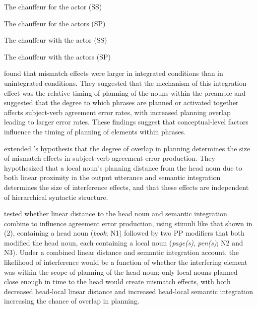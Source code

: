 \documentclass[12pt,titlepage]{article}
\newcommand{\IGNORE}[1]{} %
\begin{document}
    \begin{myexample}
\label{SP-ex}
\begin{examples}
    
    \item \label{SPintSS} The chauffeur for the actor
    \hfill (SS)\hspace{16em}
    
    \item \label{SPintSP} The chauffeur for the actors
    \hfill (SP)\hspace{16em}
    
    \item \label{SPunintSS}The chauffeur with the actor
    \hfill (SS)\hspace{16em}

    \item \label{SPwithunintSP}The chauffeur with the actors
    \hfill (SP)\hspace{16em}
    
\end{examples}
\end{myexample}


 \citeauthor{SolomonPearlmutter04} found that mismatch effects were larger in integrated conditions than in unintegrated conditions. They suggested that the mechanism of this integration effect was the relative timing of planning of the nouns within the preamble and suggested that the degree to which phrases are planned or activated together affects subject-verb agreement error rates, with increased planning overlap leading to larger error rates.  These findings suggest that conceptual-level factors influence the timing of planning of elements within phrases.
 



 extended \citeauthor{SolomonPearlmutter04}'s \citeyear{SolomonPearlmutter04} hypothesis that the degree of overlap in planning determines the size of mismatch effects in subject-verb agreement error production.  They hypothesized that a local noun's planning distance from the head noun due to both linear proximity in the output utterance and semantic integration determines the size of interference effects, and that these effects are independent of hierarchical syntactic structure. 

 tested whether linear distance to the head noun and semantic integration combine to influence agreement error
production, using stimuli like that shown in (2), containing a head noun (\textit{book}; N1) followed by two PP modifiers that both modified the head noun, each containing a local noun (\textit{page(s)}, \textit{pen(s)}; N2 and N3). \IGNORE{The
hierarchical distance of N2 and N3 was held constant (viz. both nouns modified the head noun).  }Under a combined linear distance and semantic
integration account, the likelihood of interference would be a function of
whether the interfering element was within the scope of planning of the
head noun; only local nouns planned close enough in time to the head would create mismatch effects, with both decreased head-local linear
distance and increased head-local semantic integration increasing the
chance of overlap in planning.
\end{document}
